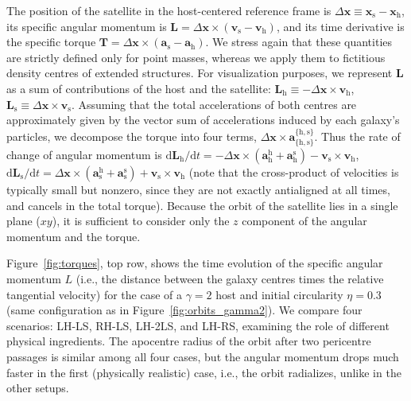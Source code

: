 \documentclass[twocolumn]{aastex63}
\newcommand{\LH}{\textsf{L\!H}\xspace}
\newcommand{\RH}{\textsf{R\!H}\xspace}
\newcommand{\LS}{\textsf{L\!S}\xspace}
\newcommand{\RS}{\textsf{R\!S}\xspace}
\begin{document}
The position of the satellite in the host-centered reference frame is $\Delta\boldsymbol{x} \equiv \boldsymbol{x}_\mathrm{s}-\boldsymbol{x}_\mathrm{h}$, its specific angular momentum is $\boldsymbol{L} = \Delta\boldsymbol{x} \times (\boldsymbol{v}_\mathrm{s}-\boldsymbol{v}_\mathrm{h})$, and its time derivative is the specific torque $\boldsymbol{T} = \Delta\boldsymbol{x} \times (\boldsymbol{a}_\mathrm{s}-\boldsymbol{a}_\mathrm{h})$. We stress again that these quantities are strictly defined only for point masses, whereas we apply them to fictitious density centres of extended structures. For visualization purposes, we represent $\boldsymbol{L}$ as a sum of contributions of the host and the satellite: $\boldsymbol{L}_\mathrm{h} \equiv -\Delta\boldsymbol{x} \times \boldsymbol{v}_\mathrm{h}$, $\boldsymbol{L}_\mathrm{s} \equiv \Delta\boldsymbol{x} \times \boldsymbol{v}_\mathrm{s}$. Assuming that the total accelerations of both centres are approximately given by the vector sum of accelerations induced by each galaxy's particles, we decompose the torque into four terms, $\Delta\boldsymbol{x} \times \boldsymbol{a}_\mathrm{\{h,s\}}^\mathrm{\{h,s\}}$. Thus the rate of change of angular momentum is $\mathrm{d}\boldsymbol{L}_\mathrm{h}/\mathrm{d}t = -\Delta\boldsymbol{x}\times(\boldsymbol{a}_\mathrm{h}^\mathrm{h}+\boldsymbol{a}_\mathrm{h}^\mathrm{s}) - \boldsymbol{v}_\mathrm{s}\times\boldsymbol{v}_\mathrm{h}$, $\mathrm{d}\boldsymbol{L}_\mathrm{s}/\mathrm{d}t = \Delta\boldsymbol{x}\times(\boldsymbol{a}_\mathrm{s}^\mathrm{h}+\boldsymbol{a}_\mathrm{s}^\mathrm{s}) + \boldsymbol{v}_\mathrm{s}\times\boldsymbol{v}_\mathrm{h}$ (note that the cross-product of velocities is typically small but nonzero, since they are not exactly antialigned at all times, and cancels in the total torque). Because the orbit of the satellite lies in a single plane ($xy$), it is sufficient to consider only the $z$ component of the angular momentum and the torque.

Figure~\ref{fig:torques}, top row, shows the time evolution of the specific angular momentum $L$ (i.e., the distance between the galaxy centres times the relative tangential velocity) for the case of a $\gamma=2$ host and initial circularity $\eta=0.3$ (same configuration as in Figure~\ref{fig:orbits_gamma2}). We compare four scenarios: \LH-\LS, \RH-\LS, \LH-2\LS, and \LH-\RS, examining the role of different physical ingredients. The apocentre radius of the orbit after two pericentre passages is similar among all four cases, but the angular momentum drops much faster in the first (physically realistic) case, i.e., the orbit radializes, unlike in the other setups.
\end{document}
